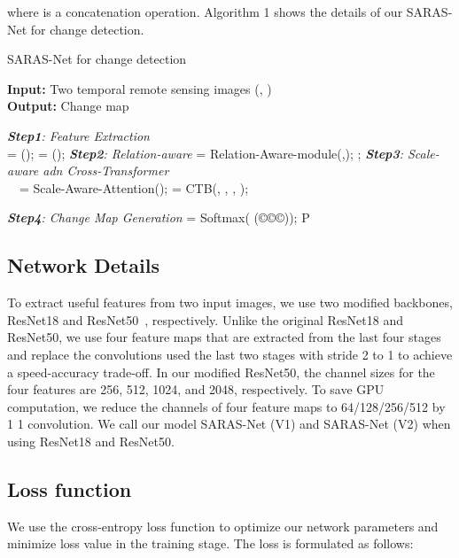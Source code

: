 \documentclass[letterpaper]{article} \usepackage{aaai23}  \usepackage{times}  \usepackage{helvet}  \usepackage{courier}  \usepackage[hyphens]{url}  \usepackage{graphicx} \urlstyle{rm} \def\UrlFont{\rm}  \usepackage{natbib}  \usepackage{caption} \frenchspacing  \setlength{\pdfpagewidth}{8.5in}  \setlength{\pdfpageheight}{11in}  \usepackage{algorithm}
\begin{document}
  
where  is a concatenation operation. Algorithm 1 shows the details of our SARAS-Net for change detection. 

\begin{algorithm}
\caption{SARAS-Net for change detection}\label{euclid}
\hspace*{\algorithmicindent} \textbf{Input:}  Two temporal remote sensing images (, ) \\
\hspace*{\algorithmicindent} \textbf{Output:}  Change map 
\begin{algorithmic}[1]
\State  \textit{ \textbf{Step1}: Feature Extraction}\\
 = ();    = ();
\State \textit{ \textbf{Step2}: Relation-aware}
    \State  = Relation-Aware-module(,); 
    \State ;  
\EndFor
\State \textit{\textbf{Step3}: Scale-aware adn Cross-Transformer}
{ \\ \  \ \quad  = Scale-Aware-Attention(); 
    \EndFor
     =  CTB(, , , ); 
}
\EndFor


\State \textit{ \textbf{Step4}: Change Map Generation}
\State 
\quad  = Softmax( (\copyright \copyright \copyright ));
\State  \Return P 
\end{algorithmic}

\end{algorithm}


\subsection{Network Details}
To extract useful features from two input images, we use two modified backbones, ResNet18 and ResNet50~\cite{He_2016_CVPR}, respectively. Unlike the original ResNet18 and ResNet50, we use four feature maps that are extracted from the last four stages and replace the convolutions used the last two stages with stride 2 to 1 to achieve a speed-accuracy trade-off. In our modified ResNet50, the channel sizes for the four features are 256, 512, 1024, and 2048, respectively. To save GPU computation, we reduce the channels of four feature maps to 64/128/256/512 by 1  1 convolution. We call our model SARAS-Net (V1) and SARAS-Net (V2) when using ResNet18 and ResNet50. 

\subsection{Loss function}
\label{sec:Loss_Function}
We use the cross-entropy loss function to optimize our network parameters and minimize loss value in the training stage. The loss is formulated as follows:
\end{document}
